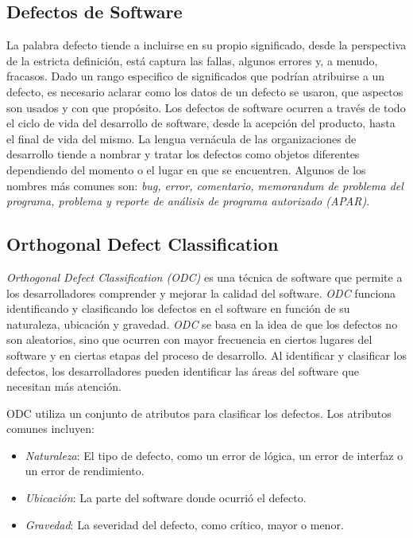 \documentclass{dense_template}
\begin{document}
\subsection{Defectos de Software}
La palabra defecto tiende a incluirse en su propio significado, desde la perspectiva de la estricta definición, está captura las fallas, algunos errores y, a menudo, fracasos. Dado un rango especifico de significados que podrían atribuirse a un defecto, es necesario aclarar como los datos de un defecto se usaron, que aspectos son usados y con que propósito. 
Los defectos de software ocurren a través de todo el ciclo de vida del desarrollo de software, desde la acepción del producto, hasta el final de vida del mismo. La lengua vernácula de las organizaciones de desarrollo tiende a nombrar y tratar los defectos como objetos diferentes dependiendo del momento o el lugar en que se encuentren. Algunos de los nombres más comunes son: \textit{bug, error, comentario, memorandum de problema del programa, problema y reporte de análisis de programa autorizado (APAR).}

\subsection{Orthogonal Defect Classification}
\textit{Orthogonal Defect Classification (ODC)} es una técnica de software que permite a los desarrolladores comprender y mejorar la calidad del software. \textit{ODC} funciona identificando y clasificando los defectos en el software en función de su naturaleza, ubicación y gravedad.
\textit{ODC} se basa en la idea de que los defectos no son aleatorios, sino que ocurren con mayor frecuencia en ciertos lugares del software y en ciertas etapas del proceso de desarrollo. Al identificar y clasificar los defectos, los desarrolladores pueden identificar las áreas del software que necesitan más atención.

ODC utiliza un conjunto de atributos para clasificar los defectos. Los atributos comunes incluyen:
    \begin{itemize}
        \item \textit{Naturaleza}: El tipo de defecto, como un error de lógica, un error de interfaz o un error de rendimiento.
        \item \textit{Ubicación}: La parte del software donde ocurrió el defecto.
        \item \textit{Gravedad}: La severidad del defecto, como crítico, mayor o menor.
    \end{itemize}
\end{document}
